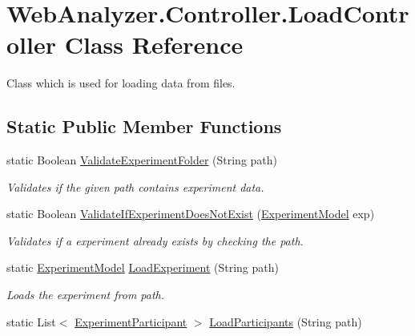 \hypertarget{class_web_analyzer_1_1_controller_1_1_load_controller}{}\section{Web\+Analyzer.\+Controller.\+Load\+Controller Class Reference}
\label{class_web_analyzer_1_1_controller_1_1_load_controller}


Class which is used for loading data from files.  


\subsection*{Static Public Member Functions}
\begin{DoxyCompactItemize}
\item 
static Boolean \hyperlink{class_web_analyzer_1_1_controller_1_1_load_controller_a4ccfcc1eddcf758a1d9c3df334750a05}{Validate\+Experiment\+Folder} (String path)
\begin{DoxyCompactList}\small\item\em Validates if the given path contains experiment data. \end{DoxyCompactList}\item 
static Boolean \hyperlink{class_web_analyzer_1_1_controller_1_1_load_controller_a2cf58e1b4a77099dc5fa14f4743fcb16}{Validate\+If\+Experiment\+Does\+Not\+Exist} (\hyperlink{class_web_analyzer_1_1_models_1_1_base_1_1_experiment_model}{Experiment\+Model} exp)
\begin{DoxyCompactList}\small\item\em Validates if a experiment already exists by checking the path. \end{DoxyCompactList}\item 
static \hyperlink{class_web_analyzer_1_1_models_1_1_base_1_1_experiment_model}{Experiment\+Model} \hyperlink{class_web_analyzer_1_1_controller_1_1_load_controller_a49122060869d7d678c3f0518f70bbe04}{Load\+Experiment} (String path)
\begin{DoxyCompactList}\small\item\em Loads the experiment from path. \end{DoxyCompactList}\item 
static List$<$ \hyperlink{class_web_analyzer_1_1_models_1_1_base_1_1_experiment_participant}{Experiment\+Participant} $>$ \hyperlink{class_web_analyzer_1_1_controller_1_1_load_controller_adc9166c45bf2b2a3fe1b89dc72e539bc}{Load\+Participants} (String path)

\end{DoxyCompactItemize}
